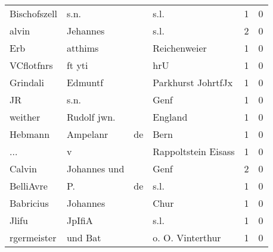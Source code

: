 \begin{center}
\begin{tiny}
\begin{longtabu}{llllrr}
             Bischofszell &                               s.n. &             &                                        s.l. &          1 &         0 \\
                    alvin &                           Jehannes &             &                                        s.l. &          2 &         0 \\
                      Erb &                            atthims &             &                                Reichenweier &          1 &         0 \\
               VCflotfnrs &                             ft yti &             &                                         hrU &          1 &         0 \\
                 Grindali &                            Edmuntf &             &                          Parkhurst JohrtfJx &          1 &         0 \\
                       JR &                               s.n. &             &                                        Genf &          1 &         0 \\
                  weither &                        Rudolf jwn. &             &                                     England &          1 &         0 \\
                  Hebmann &                           Ampelanr &          de &                                        Bern &          1 &         0 \\
                      ... &                                  v &             &                         Rappoltstein Eisass &          1 &         0 \\
                   Calvin &                       Johannes und &             &                                        Genf &          2 &         0 \\
                BelliAvre &                                 P. &          de &                                        s.l. &          1 &         0 \\
                Babricius &                           Johannes &             &                                        Chur &          1 &         0 \\
                    Jlifu &                             JpIfiA &             &                                        s.l. &          1 &         0 \\
              rgermeister &                            und Bat &             &                            o. O. Vinterthur &          1 &         0 \\

\end{longtabu}
\end{tiny}
\end{center}
